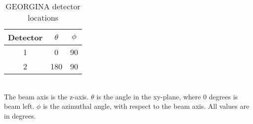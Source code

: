 \begin{table}[]
    \centering
    \caption{GEORGINA detector locations}
    \label{tab:GEORGE_Det_Loc}
    \begin{tabular}{c|c|c} \toprule
         Detector & $\theta$ & $\phi$  \\
         \hline
         1 & 0 & 90 \\ 
         2 & 180 & 90\\ \bottomrule
    \end{tabular}
    \\[2]
    \footnotesize
    The beam axis is the z-axis. $\theta$ is the angle in the xy-plane, where 0 degrees is beam left. $\phi$ is the azimuthal angle, with respect to the beam axis. All values are in degrees.
\end{table}
